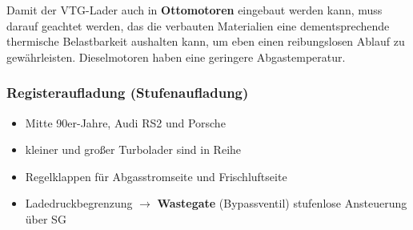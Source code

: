 Damit der VTG-Lader auch in \textbf{Ottomotoren} eingebaut werden kann,
muss darauf geachtet werden, das die verbauten Materialien eine
dementsprechende thermische Belastbarkeit aushalten kann, um eben einen
reibungslosen Ablauf zu gewährleisten. Dieselmotoren haben eine
geringere Abgastemperatur.

\subsubsection{Registeraufladung
(Stufenaufladung)}\label{registeraufladung-stufenaufladung}

\begin{itemize}
\item
  Mitte 90er-Jahre, Audi RS2 und Porsche
\item
  kleiner und großer Turbolader sind in Reihe
\item
  Regelklappen für Abgasstromseite und Frischluftseite
\item
  Ladedruckbegrenzung $\to$ \textbf{Wastegate} (Bypassventil)
  stufenlose Ansteuerung über SG
\end{itemize}

